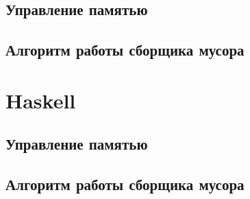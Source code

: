 \subsection{Управление памятью}
\subsection{Алгоритм работы сборщика мусора}
%
%
%
%
%
%
%
%
%
%
%





\section{Haskell}
\subsection{Управление памятью}
\subsection{Алгоритм работы сборщика мусора}

%
%
%
%
%
%
%
%
%
%
%
%
%
%
%
